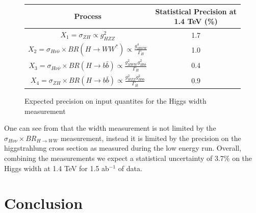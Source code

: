 \begin{figure}
  \centering
  \begin{tabular}{c c }
   \toprule
    Process & Statistical Precision at 1.4 TeV (\%)    \\
    \midrule
    $X_1=\sigma_{ZH} \propto g_{HZZ}^2$ & 1.7 \\
    \midrule
    $X_2=\sigma_{H\nu\bar{\nu}} \times BR(H\rightarrow WW^*) \propto \frac{g_{HWW}^4}{\Gamma_H}$ & 1.0\\
    \midrule
    $X_3=\sigma_{H\nu\bar{\nu}} \times BR(H\rightarrow b\bar{b}) \propto \frac{g_{HWW}^{2}g_{Hbb}^2}{\Gamma_H}$ & 0.4\\
    \midrule
    $X_4=\sigma_{ZH} \times BR(H\rightarrow b\bar{b}) \propto \frac{g_{HZZ}^{2}g_{Hbb}^2}{\Gamma_H}$ & 0.9 \\
    \bottomrule
  \end{tabular}
  \caption[Expected precision on input quantites for the Higgs width measurement]{Expected precision on input quantites for the Higgs width measurement}
  \label{fig:higgscomparison}
\end{figure}

One can see from  that the width measurement is not limited by the $\sigma_{H\nu\nu}\times BR_{H\rightarrow WW}$ measurement, instead it is limited by the precision on the higgstrahlung cross section as measured during the low energy run. Overall, combining the measurements we expect a statistical uncertainty of 3.7\% on the Higgs width at 1.4 TeV for 1.5 ab$^{-1}$ of data.

\section{Conclusion}

